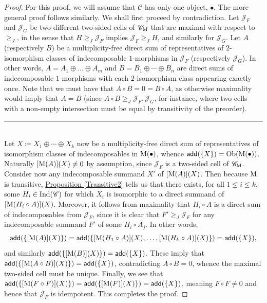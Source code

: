 \noindent\begin{proof} For this proof, we will assume that $\mathscr{C}$ has only one object, $\bullet$. The more general proof follows similarly. We shall first proceed by contradiction. Let $\mathcal{J}_F$ and $\mathcal{J}_G$ be two different two-sided cells of $\mathscr{C}_\textup{M}$ that are maximal with respect to $\geq_{J}$, in the sense that $H \geq_{J} \mathcal{J}_F$ implies $\mathcal{J}_F \geq_{J} H$, and similarly for $\mathcal{J}_G$. Let $A$ (respectively $B$) be a multiplicity-free direct sum of representatives of $2$-isomorphism classes of indecomposable $1$-morphisms in $\mathcal{J}_F$ (respectively $\mathcal{J}_G$). In other words, $A = A_1 \oplus \dots \oplus A_m$ and $B = B_1 \oplus \cdots \oplus B_n$ are direct sums of indecomposable $1$-morphisms with each $2$-isomorphism class appearing exactly once. Note that we must have that $A \circ B = 0 = B \circ A$, as otherwise maximality would imply that $A = B$ (since $A \circ B \geq_{J} \mathcal{J}_F, \mathcal{J}_G$, for instance, where two cells with a non-empty intersection must be equal by transitivity of the preorder).\\[-1.5\baselineskip]
\begin{center}
\rule{0.5\linewidth}{1pt}
\end{center}
\noindent\\[-\baselineskip]
\noindent Let $X \coloneqq X_1 \oplus \cdots \oplus X_k$ now be a multiplicity-free direct sum of representatives of isomorphism classes of indecomposables in $\textup{M}({\bullet})$, whence $\textsf{add}(\{X\}) = \textnormal{Ob}(\textup{M}({\bullet}))$. Naturally $[\textup{M}(A)](X) \neq 0$ by assumption, since $\mathcal{J}_F$ is a two-sided cell of $\mathscr{C}_\textup{M}$. Consider now any indecomposable summand $X'$ of $[\textup{M}(A)](X)$. Then because $\textup{M}$ is transitive, \hyperref[Transitive2]{Proposition \ref*{Transitive2}} tells us that there exists, for all $1 \leq i \leq k$, some $H_i \in \textup{Ind}(\mathscr{C})$ for which $X_i$ is isomorphic to a direct summand of $[\textup{M}(H_i \circ A)](X)$. Moreover, it follows from maximality that $H_i \circ A$ is a direct sum of indecomposables from $\mathcal{J}_F$, since it is clear that $F' \geq_{J} \mathcal{J}_F$ for any indecomposable summand $F'$ of some $H_i \circ A_j$. In other words,
\begin{align*}
\begin{split}
\textsf{add}(\{[\textup{M}(A)](X)\}) = \textsf{add}(\{[\textup{M}(H_1 \circ A)](X), \dots, [\textup{M}(H_k \circ A)](X)\}) = \textsf{add}(\{X\}),
\end{split}
\end{align*}
\noindent and similarly $\textsf{add}(\{[\textup{M}(B)](X)\}) = \textsf{add}(\{X\})$. These imply that $\textsf{add}(\{[\textup{M}(A \circ B)](X)\}) = \textsf{add}(\{X\})$, contradicting $A \circ B = 0$, whence the maximal two-sided cell must be unique. Finally, we see that $\textsf{add}(\{[\textup{M}(F \circ F)](X)\}) = \textsf{add}(\{[\textup{M}(F)](X)\}) = \textsf{add}(\{X\})$, meaning $F \circ F \neq 0$ and hence that $\mathcal{J}_F$ is idempotent. This completes the proof.
\end{proof}
\newpage

